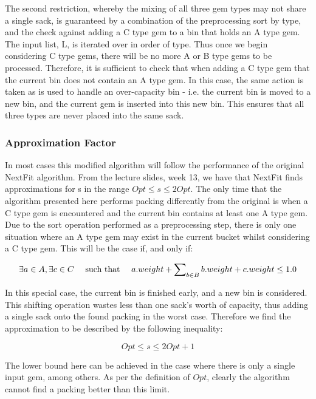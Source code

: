 \documentclass[paper=a4, fontsize=12pt]{article}
\begin{document}
The second restriction, whereby the mixing of all three gem types may not share
a single sack, is guaranteed by a combination of the preprocessing sort by
type, and the check against adding a C type gem to a bin that holds an A type
gem. The input list, L, is iterated over in order of type. Thus once we begin
considering C type gems, there will be no more A or B type gems to be
processed. Therefore, it is sufficient to check that when adding a C type gem
that the current bin does not contain an A type gem. In this case, the same
action is taken as is used to handle an over-capacity bin - i.e. the current
bin is moved to a new bin, and the current gem is inserted into this new
bin. This ensures that all three types are never placed into the same sack.

\subsubsection{Approximation Factor}
In most cases this modified algorithm will follow the performance of the
original NextFit algorithm. From the lecture slides, week 13, we have that
NextFit finds approximations for s in the range \(Opt \leq s \leq 2 Opt\). The
only time that the algorithm presented here performs packing differently from
the original is when a C type gem is encountered and the current bin contains
at least one A type gem. Due to the sort operation performed as a preprocessing
step, there is only one situation where an A type gem may exist in the current
bucket whilst considering a C type gem. This will be the case if, and only if:

\begin{displaymath}
\exists a \in A, \exists c \in C \text{ \quad such that \quad } a.weight + \sum\nolimits_{b \in B} b.weight + c.weight \leq 1.0
\end{displaymath}

In this special case, the current bin is finished early, and a new bin is
considered. This shifting operation wastes less than one sack's worth of
capacity, thus adding a single sack onto the found packing in the worst
case. Therefore we find the approximation to be described by the following
inequality:

\begin{displaymath}
Opt \leq s \leq 2 Opt + 1
\end{displaymath}

The lower bound here can be achieved in the case where there is only a single input gem, among others. As per the definition of \(Opt\), clearly the algorithm cannot find a packing better than this limit.
\end{document}
